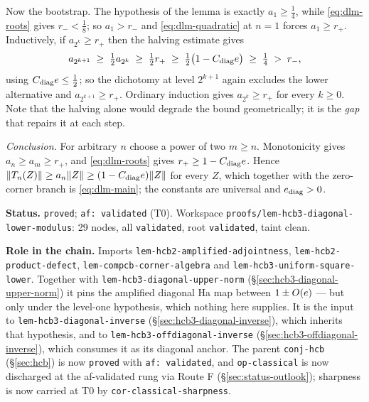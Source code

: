 Now the bootstrap. The hypothesis of the lemma is exactly $a_1\ge\tfrac14$, while
\eqref{eq:dlm-roots} gives $r_-<\tfrac18$; so $a_1>r_-$ and \eqref{eq:dlm-quadratic} at
$n=1$ forces $a_1\ge r_+$. Inductively, if $a_{2^{k}}\ge r_+$ then the halving estimate
gives
\[
  a_{2^{k+1}}\;\ge\;\tfrac12a_{2^{k}}\;\ge\;\tfrac12 r_+\;\ge\;\tfrac12\bigl(1-C_{\mathrm{diag}}e\bigr)\;\ge\;\tfrac14\;>\;r_- ,
\]
using $C_{\mathrm{diag}}e\le\tfrac12$; so the dichotomy at level $2^{k+1}$ again
excludes the lower alternative and $a_{2^{k+1}}\ge r_+$. Ordinary induction gives
$a_{2^{k}}\ge r_+$ for every $k\ge0$. Note that the halving alone would degrade the bound
geometrically; it is the \emph{gap} that repairs it at each step.

\emph{Conclusion.} For arbitrary $n$ choose a power of two $m\ge n$. Monotonicity gives
$a_n\ge a_m\ge r_+$, and \eqref{eq:dlm-roots} gives $r_+\ge1-C_{\mathrm{diag}}e$.
Hence $\lVert T_n(Z)\rVert\ge a_n\lVert Z\rVert\ge(1-C_{\mathrm{diag}}e)\lVert Z\rVert$ for every $Z$,
which together with the zero-corner branch is \eqref{eq:dlm-main}; the constants are
universal and $e_{\mathrm{diag}}>0$.

\medskip
\noindent\textbf{Status.} \texttt{proved}; \texttt{af: validated} (T0). Workspace
\texttt{proofs/lem-hcb3-diagonal-lower-modulus}: 29 nodes, all \texttt{validated}, root
\texttt{validated}, taint clean.

\noindent\textbf{Role in the chain.} Imports
\texttt{lem-hcb2-amplified-adjointness},
\texttt{lem-hcb2-product-defect},
\texttt{lem-compcb-corner-algebra} and
\texttt{lem-hcb3-uniform-square-lower}. Together with
\texttt{lem-hcb3-diagonal-upper-norm} (\S\ref{sec:hcb3-diagonal-upper-norm}) it pins the
amplified diagonal Ha map between $1\pm O(e)$ --- but only under the level-one
hypothesis, which nothing here supplies. It is the input to
\texttt{lem-hcb3-diagonal-inverse} (\S\ref{sec:hcb3-diagonal-inverse}), which inherits
that hypothesis, and to \texttt{lem-hcb3-offdiagonal-inverse}
(\S\ref{sec:hcb3-offdiagonal-inverse}), which consumes it as its diagonal anchor. The
parent \texttt{conj-hcb} (\S\ref{sec:hcb}) is now \texttt{proved} with
\texttt{af: validated}, and \texttt{op-classical} is now discharged at the af-validated rung via Route F (\S\ref{sec:status-outlook}); sharpness is now carried at T0 by \texttt{cor-classical-sharpness}.
